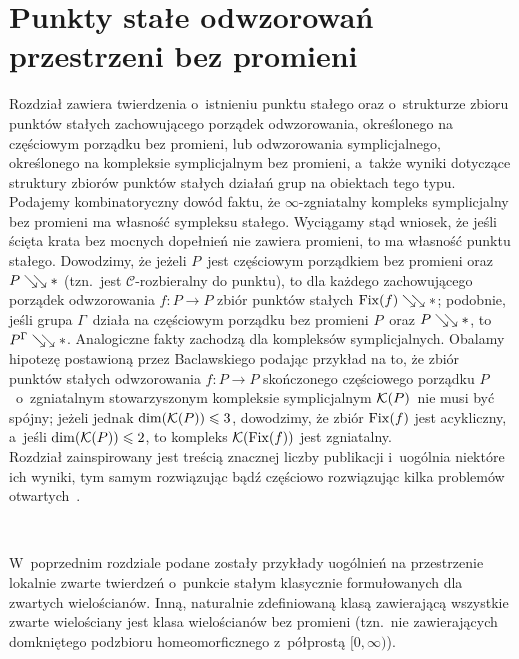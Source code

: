 \chapter{Punkty stałe odwzorowań przestrzeni bez promieni}\label{chap5}
\begin{center}
\begin{minipage}{14cm}
{\small
Rozdział zawiera twierdzenia o~istnieniu punktu stałego oraz o~strukturze zbioru punktów stałych zachowującego porządek odwzorowania, określonego na częściowym porządku bez promieni, lub odwzorowania symplicjalnego, określonego na kompleksie symplicjalnym bez promieni, a~także wyniki dotyczące struktury zbiorów punktów stałych działań grup na obiektach tego typu.\\

Podajemy kombinatoryczny dowód faktu, że $\infty$-zgniatalny kompleks symplicjalny bez promieni ma własność sympleksu stałego. Wyciągamy stąd wniosek, że jeśli ścięta krata bez mocnych dopełnień nie zawiera promieni, to ma własność punktu stałego. Dowodzimy, że jeżeli $P$~jest częściowym porządkiem bez promieni oraz $P\searrow\!\!\searrow *$ (tzn.~jest $\mathcal{C}$-rozbieralny do punktu), to dla każdego zachowującego porządek odwzorowania $f\colon P\to P$ zbiór punktów stałych $\operatorname{Fix}(f)\searrow\!\!\searrow *$; podobnie, jeśli grupa $\Gamma$~działa na częściowym porządku bez promieni $P$~oraz $P\searrow\!\!\searrow *$, to $P^\Gamma\searrow\!\!\searrow *$. Analogiczne fakty zachodzą dla kompleksów symplicjalnych. Obalamy hipotezę postawioną przez Baclawskiego podając przykład na to, że zbiór punktów stałych odwzorowania $f\colon P\to P$ skończonego częściowego porządku $P$~o~zgniatalnym stowarzyszonym kompleksie symplicjalnym $\mathcal{K}(P)$~nie musi być spójny; jeżeli jednak $\dim(\mathcal{K}(P))\leqslant 3$, dowodzimy, że zbiór $\operatorname{Fix}(f)$ jest acykliczny, a~jeśli $\dim(\mathcal{K}(P))\leqslant 2$, to kompleks $\mathcal{K}(\operatorname{Fix}(f))$ jest zgniatalny.
\\

Rozdział zainspirowany jest treścią znacznej liczby publikacji \cite{Baclawski12,Barmak12,Duffus80a,Hensel14,Okhezin95,Segev93,Segev94} i~uogólnia niektóre ich wyniki, tym samym rozwiązując bądź częściowo rozwiązując kilka problemów otwartych~\cite{Baclawski12,Bjorner81,Hensel14,Schroder99,Schroder03}.
}\end{minipage}\\[1.7cm]
\end{center}

W~poprzednim rozdziale podane zostały przykłady uogólnień na przestrzenie lokalnie zwarte twierdzeń o~punkcie stałym klasycznie formułowanych dla zwartych wielościanów. Inną, naturalnie zdefiniowaną klasą zawierającą wszystkie zwarte wielościany jest klasa wielościanów bez promieni (tzn.~nie zawierających domkniętego podzbioru homeomorficznego z~półprostą $[0,\infty)$). 


